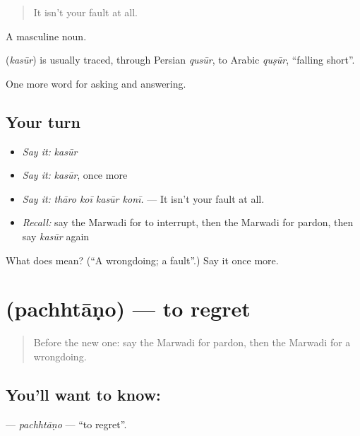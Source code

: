 \begin{quote}
It isn't your fault at all.
\end{quote}

A masculine noun.

\begin{cousinweb}
\textbf{} (\emph{kasūr}) is usually traced, through Persian \emph{qusūr}, to Arabic \emph{quṣūr}, \textquotedblleft{}falling short\textquotedblright{}.
\end{cousinweb}

\begin{grammarlens}[title={What you've built}]
One more word for asking and answering.
\end{grammarlens}

\subsection*{Your turn}
\begin{itemize}
\raggedright
  \item \emph{Say it:} \emph{kasūr}
  \item \emph{Say it:} \emph{kasūr}, once more
  \item \emph{Say it:} \emph{thāro koī kasūr konī.} — It isn't your fault at all.
  \item \emph{Recall:} say the Marwadi for to interrupt, then the Marwadi for pardon, then say \emph{kasūr} again
\end{itemize}

\begin{tcolorbox}[breakable,colback=teal!4,colframe=teal!35!black,title={Before you move on}]
What does  mean? (\textquotedblleft{}A wrongdoing; a fault\textquotedblright{}.) Say it once more.
\end{tcolorbox}
\section[\texorpdfstring{\mw{पछताणो} (pachhtāṇo)}{पछताणो (pachhtāṇo)}]{ (pachhtāṇo) — to regret}

\label{lesson:MW-C270-pachhtano}



\begin{quote}
Before the new one: say the Marwadi for pardon, then the Marwadi for a wrongdoing.
\end{quote}

\subsection*{You'll want to know: }
\textbf{} — \emph{pachhtāṇo} — \textquotedblleft{}to regret\textquotedblright{}.

